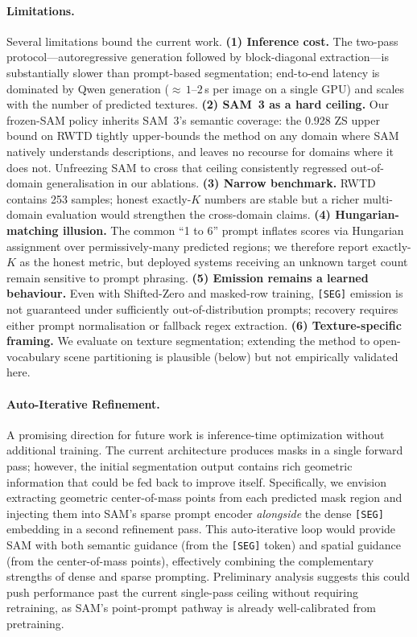 \documentclass{article}
\begin{document}
\paragraph{Limitations.}
Several limitations bound the current work. \textbf{(1) Inference cost.} The two-pass protocol---autoregressive generation followed by block-diagonal extraction---is substantially slower than prompt-based segmentation; end-to-end latency is dominated by Qwen generation (${\approx}\,1$--$2$\,s per image on a single GPU) and scales with the number of predicted textures. \textbf{(2) SAM~3 as a hard ceiling.} Our frozen-SAM policy inherits SAM~3's semantic coverage: the 0.928 ZS upper bound on RWTD tightly upper-bounds the method on any domain where SAM natively understands descriptions, and leaves no recourse for domains where it does not. Unfreezing SAM to cross that ceiling consistently regressed out-of-domain generalisation in our ablations. \textbf{(3) Narrow benchmark.} RWTD contains 253 samples; honest exactly-$K$ numbers are stable but a richer multi-domain evaluation would strengthen the cross-domain claims. \textbf{(4) Hungarian-matching illusion.} The common ``1 to 6'' prompt inflates scores via Hungarian assignment over permissively-many predicted regions; we therefore report exactly-$K$ as the honest metric, but deployed systems receiving an unknown target count remain sensitive to prompt phrasing. \textbf{(5) Emission remains a learned behaviour.} Even with Shifted-Zero and masked-row training, \texttt{[SEG]} emission is not guaranteed under sufficiently out-of-distribution prompts; recovery requires either prompt normalisation or fallback regex extraction. \textbf{(6) Texture-specific framing.} We evaluate on texture segmentation; extending the method to open-vocabulary scene partitioning is plausible (below) but not empirically validated here.

\paragraph{Auto-Iterative Refinement.}
A promising direction for future work is inference-time optimization without additional training. The current architecture produces masks in a single forward pass; however, the initial segmentation output contains rich geometric information that could be fed back to improve itself. Specifically, we envision extracting geometric center-of-mass points from each predicted mask region and injecting them into SAM's sparse prompt encoder \emph{alongside} the dense \texttt{[SEG]} embedding in a second refinement pass. This auto-iterative loop would provide SAM with both semantic guidance (from the \texttt{[SEG]} token) and spatial guidance (from the center-of-mass points), effectively combining the complementary strengths of dense and sparse prompting. Preliminary analysis suggests this could push performance past the current single-pass ceiling without requiring retraining, as SAM's point-prompt pathway is already well-calibrated from pretraining.
\end{document}
